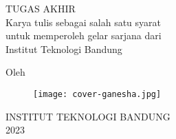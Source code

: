 \clearpage
\pagestyle{empty}

\begin{center}
    \smallskip

    \large \bfseries \MakeUppercase{\thetitle}
    \vfill

    \large TUGAS AKHIR \\
    \small Karya tulis sebagai salah satu syarat \\
    \small untuk memperoleh gelar sarjana dari \\
    \small Institut Teknologi Bandung
    \vfill

    \large Oleh

    \large \theauthor

    \vfill
    \begin{figure}[h]
        \centering
        \texttt{[image: cover-ganesha.jpg]}
    \end{figure}
    \vfill

    \large
    \uppercase{
        Institut Teknologi Bandung \\
        2023 \\
    }
\end{center}




\clearpage
